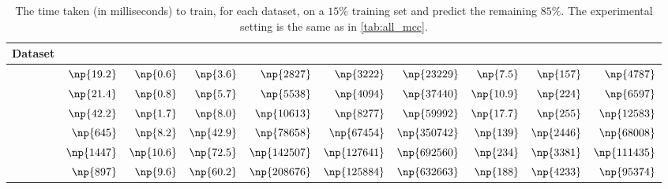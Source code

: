 \begin{table}[htb]
  \centering
  \scriptsize
  \caption{The time taken (in milliseconds) to train, for each dataset, on a $15\%$ training set and
    predict the remaining $85\%$. The experimental setting is the same as in \autoref{tab:all_mcc}.
  \label{tab:all_time}}
  \begin{tabular}{lrrrr|rrrrr}
    \toprule
    Dataset & \uslpropGsec{} & \usrule{}   & \uslogregp{} & \usoptim{}    & \complowrank{} & \compmaxnorm{} & \comptriads{} & \compranknodes{} & \compbayesian{} \\
    \midrule
    \aut{}  & $\np{19.2}$    & $\np{0.6}$  & $\np{3.6}$   & $\np{2827}$   & $\np{3222}$    & $\np{23229}$   & $\np{7.5}$    & $\np{157}$       & $\np{4787}$     \\
    \adv{}  & $\np{21.4}$    & $\np{0.8}$  & $\np{5.7}$   & $\np{5538}$   & $\np{4094}$    & $\np{37440}$   & $\np{10.9}$   & $\np{224}$       & $\np{6597}$     \\
    \wik{}  & $\np{42.2}$    & $\np{1.7}$  & $\np{8.0}$   & $\np{10613}$  & $\np{8277}$    & $\np{59992}$   & $\np{17.7}$   & $\np{255}$       & $\np{12583}$    \\
    \sla{}  & $\np{645}$     & $\np{8.2}$  & $\np{42.9}$  & $\np{78658}$  & $\np{67454}$   & $\np{350742}$  & $\np{139}$    & $\np{2446}$      & $\np{68008}$    \\
    \epi{}  & $\np{1447}$    & $\np{10.6}$ & $\np{72.5}$  & $\np{142507}$ & $\np{127641}$  & $\np{692560}$  & $\np{234}$    & $\np{3381}$      & $\np{111435}$   \\
    \kiw{}  & $\np{897}$     & $\np{9.6}$  & $\np{60.2}$  & $\np{208676}$ & $\np{125884}$  & $\np{632663}$  & $\np{188}$    & $\np{4233}$      & $\np{95374}$    \\
    \bottomrule
  \end{tabular}
\end{table}
